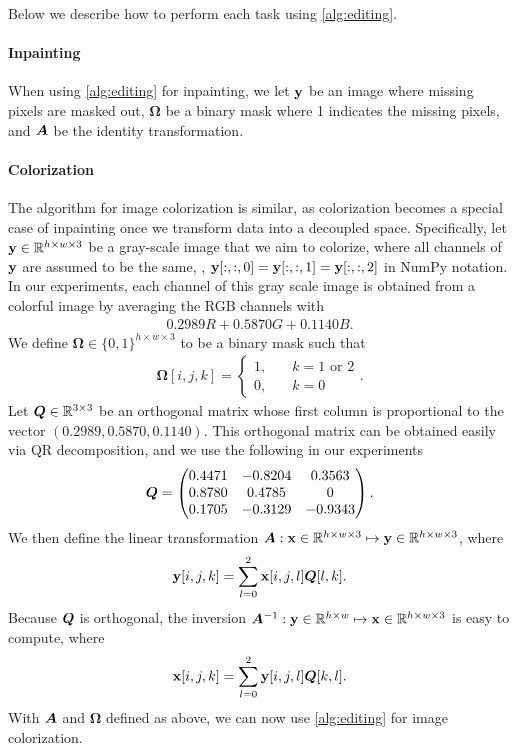 \begin{appendices}
Below we describe how to perform each task using \cref{alg:editing}.
\paragraph{Inpainting}
When using \cref{alg:editing} for inpainting, we let ${\mathbf{y}}$ be an image where missing pixels are masked out, $\bm{\Omega}$ be a binary mask where 1 indicates the missing pixels, and ${\bm{A}}$ be the identity transformation.

\paragraph{Colorization}
The algorithm for image colorization is similar, as colorization becomes a special case of inpainting once we transform data into a decoupled space. Specifically, let ${\mathbf{y}} \in \mathbb{R}^{h\times w\times 3}$ be a gray-scale image that we aim to colorize, where all channels of ${\mathbf{y}}$ are assumed to be the same, \ie, ${\mathbf{y}}[:, :, 0] = {\mathbf{y}}[:, :, 1] = {\mathbf{y}}[:, :, 2]$ in NumPy notation. In our experiments, each channel of this gray scale image is obtained from a colorful image by averaging the RGB channels with
\begin{align*}
    0.2989 R + 0.5870 G + 0.1140 B.
\end{align*}
We define $\bm{\Omega} \in \{0, 1\}^{h\times w\times 3}$ to be a binary mask such that
\begin{align*}
    \bm{\Omega}[i, j, k] = \begin{cases}
        1, &\quad \text{$k=1$ or $2$}\\
        0, &\quad \text{$k=0$}
    \end{cases}.
\end{align*}
Let ${\bm{Q}} \in \mathbb{R}^{3\times 3}$ be an orthogonal matrix whose first column is proportional to the vector $(0.2989, 0.5870, 0.1140)$. This orthogonal matrix can be obtained easily via QR decomposition, and we use the following in our experiments
\begin{align*}
    {\bm{Q}} = \begin{pmatrix}
        0.4471 & -0.8204 & 0.3563\\
        0.8780 & 0.4785 &  0 \\
        0.1705 & -0.3129 & -0.9343
    \end{pmatrix}.
\end{align*}
We then define the linear transformation ${\bm{A}}: {\mathbf{x}} \in \mathbb{R}^{h\times w \times 3} \mapsto {\mathbf{y}} \in \mathbb{R}^{h\times w \times 3}$, where
\begin{align*}
    {\mathbf{y}}[i, j, k] = \sum_{l=0}^2 {\mathbf{x}}[i, j, l] {\bm{Q}}[l, k].
\end{align*}
Because ${\bm{Q}}$ is orthogonal, the inversion $\mA^{-1} : \rvy \in \mbb{R}^{h \times w \time 3} \mapsto \rvx \in \mbb{R}^{h \times w \times 3}$ is easy to compute, where
\begin{align*}
    {\mathbf{x}}[i, j, k] = \sum_{l=0}^2 {\mathbf{y}}[i, j, l] {\bm{Q}}[k, l].
\end{align*}
With ${\bm{A}}$ and $\bm{\Omega}$ defined as above, we can now use \cref{alg:editing} for image colorization.


\end{appendices}
